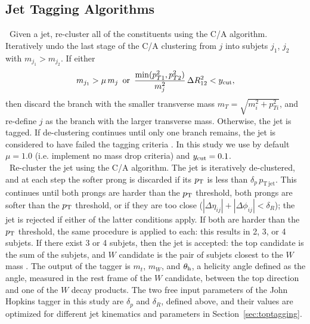  
 
\subsection{Jet Tagging Algorithms}
\label{sec:taggers}

~Given a jet, re-cluster all of the constituents using the C/A algorithm. Iteratively undo the last stage of the C/A clustering from $j$ into subjets $j_1$, $j_2$ with $m_{j_1}>m_{j_2}$. If either
%
\begin{equation}
m_{j_1} > \mu \, m_j\,\,\,\mathrm{or}\,\,\, \frac{\mathrm{min}(p_{T1}^2,p_{T2}^2)}{m_j^2}\,\Delta R_{12}^2 < y_{\rm cut},
\end{equation}
%
then discard the branch with the smaller transverse mass $m_T = \sqrt{m_i^2 + p_{Ti}^2}$, and re-define $j$ as the branch with the larger transverse mass. Otherwise, the jet is tagged. If de-clustering continues until only one branch remains, the jet is considered to have failed the tagging criteria \cite{Dasgupta:2013ihk}. In this study we use by default $\mu = 1.0$ (i.e. implement no mass drop criteria) and $y_{\rm cut} = 0.1$.\\


~Re-cluster the jet using the C/A algorithm. The jet is iteratively de-clustered, and at each step the softer prong is discarded if its $p_{\rm T}$ is less than $\delta_p\,p_{\mathrm{T\,jet}}$. This continues until both prongs are harder than the $p_{\rm T}$ threshold, both prongs are softer than the $p_{\rm T}$ threshold, or if they are too close ($|\Delta\eta_{ij}|+|\Delta\phi_{ij}|<\delta_R$); the jet is rejected if either of the latter conditions apply. If both are harder than the $p_{\rm T}$ threshold, the same procedure is applied to each: this results in 2, 3, or 4 subjets. If there exist 3 or 4 subjets, then the jet is accepted: the top candidate is the sum of the subjets, and $W$ candidate is the pair of subjets closest to the $W$ mass \cite{Kaplan:2008ie}. The output of the tagger is $m_t$, $m_W$, and $\theta_{\rm h}$, a helicity angle defined as the angle, measured in the rest frame of the $W$ candidate, between the top direction and one of the $W$ decay products. The two free input parameters of the John Hopkins tagger in this study are $\delta_p$ and $\delta_R$, defined above, and their values are optimized for different jet kinematics and parameters in Section~\ref{sec:toptagging}.\\

